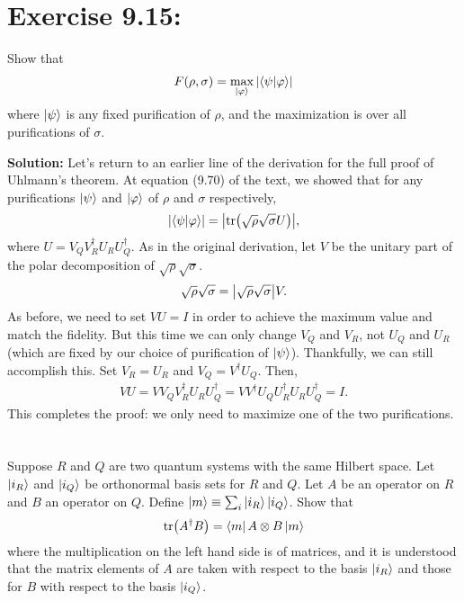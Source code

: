 \documentclass{book}
\begin{document}
\section*{Exercise 9.15:}
    Show that
    \begin{align}
        F(\rho, \sigma) = \max_{\ket{\varphi}} \abs{\bra{\psi}\ket{\varphi}}
    \end{align}
    where $\ket{\psi}$ is any fixed purification of $\rho$, and the maximization is over all purifications of $\sigma$.
    
    \textbf{Solution:} Let's return to an earlier line of the derivation for the full proof of Uhlmann's theorem. At equation (9.70) of the text, we showed that for any purifications $\ket{\psi}$ and $\ket{\varphi}$ of $\rho$ and $\sigma$ respectively,
    \begin{align}
        \abs{\bra{\psi}\ket{\varphi}} = \abs{\tr(\sqrt{\rho}\sqrt{\sigma}U)},
    \end{align}
    where $U = V_Q V_R^\dagger U_R U_Q^\dagger$. As in the original derivation, let $V$ be the unitary part of the polar decomposition of $\sqrt{\rho}\sqrt{\sigma}$.
    \begin{align}
        \sqrt{\rho}\sqrt{\sigma} = \abs{\sqrt{\rho}\sqrt{\sigma}} V.
    \end{align}
    As before, we need to set $VU=I$ in order to achieve the maximum value and match the fidelity. But this time we can only change $V_Q$ and $V_R$, not $U_Q$ and $U_R$ (which are fixed by our choice of purification of $\ket{\psi}$). Thankfully, we can still accomplish this. Set $V_R = U_R$ and $V_Q = V^\dagger U_Q$. Then,
    \begin{align}
        VU = V V_Q V_R^\dagger U_R U_Q^\dagger = V V^\dagger U_Q U_R^\dagger U_R U_Q^\dagger = I.
    \end{align}
    This completes the proof: we only need to maximize one of the two purifications.
    
\section*{}
    Suppose $R$ and $Q$ are two quantum systems with the same Hilbert space. Let $\ket{i_R}$ and $\ket{i_Q}$ be orthonormal basis sets for $R$ and $Q$. Let $A$ be an operator on $R$ and $B$ an operator on $Q$. Define $\ket{m} \equiv \sum_i \ket{i_R}\ket{i_Q}$. Show that
    \begin{align}
        \tr(A^\dagger B) = \bra{m} A \otimes B \ket{m}
    \end{align}
    where the multiplication on the left hand side is of matrices, and it is understood that the matrix elements of $A$ are taken with respect to the basis $\ket{i_R}$ and those for $B$ with respect to the basis $\ket{i_Q}$.
    
\end{document}
